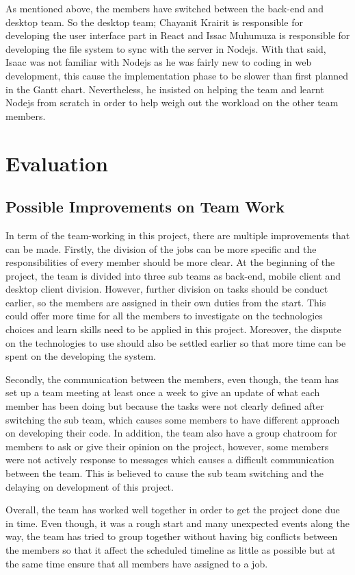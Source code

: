 \documentclass{article}
\begin{document}
As mentioned above, the members have switched between the back-end and desktop team. So the desktop team; Chayanit Krairit is responsible for developing the user interface part in React and Issac Muhumuza is responsible for developing the file system to sync with the server in Nodejs. With that said, Isaac was not familiar with Nodejs as he was fairly new to coding in web development, this cause the implementation phase to be slower than first planned in the Gantt chart. Nevertheless, he insisted on helping the team and learnt Nodejs from scratch in order to help weigh out the workload on the other team members.


\section{Evaluation}
\subsection{Possible Improvements on Team Work}
In term of the team-working in this project, there are multiple improvements that can be made. Firstly, the division of the jobs can be more specific and the responsibilities of every member should be more clear. At the beginning of the project, the team is divided into three sub teams as back-end, mobile client and desktop client division. However, further division on tasks should be conduct earlier, so the members are assigned in their own duties from the start. This could offer more time for all the members to investigate on the technologies choices and learn skills need to be applied in this project. Moreover, the dispute on the technologies to use should also be settled earlier so that more time can be spent on the developing the system. 

Secondly, the communication between the members, even though, the team has set up a team meeting at least once a week to give an update of what each member has been doing but because the tasks were not clearly defined after switching the sub team, which causes some members to have different approach on developing their code. In addition, the team also have a group chatroom for members to ask or give their opinion on the project, however, some members were not actively response to messages which causes a difficult communication between the team. This is believed to cause the sub team switching and the delaying on development of this project. 

Overall, the team has worked well together in order to get the project done due in time. Even though, it was a rough start and many unexpected events along the way, the team has tried to group together without having big conflicts between the members so that it affect the scheduled timeline as little as possible but at the same time ensure that all members have assigned to a job.
\end{document}

